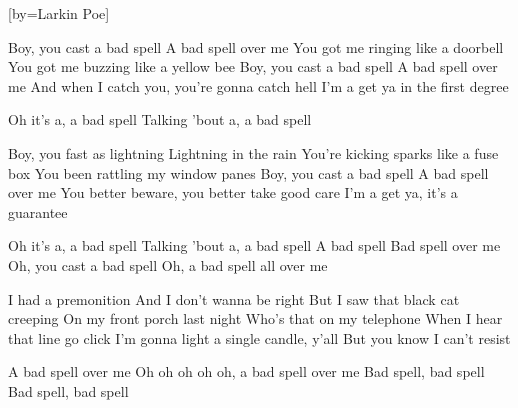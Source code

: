 [by={Larkin Poe}]


  \chordsoff
  
  \beginverse
  Boy, you cast a bad spell
  A bad spell over me
  You got me ringing like a doorbell
  You got me buzzing like a yellow bee
  Boy, you cast a bad spell
  A bad spell over me
  And when I catch you, you're gonna catch hell
  I'm a get ya in the first degree
  \endverse
  
  \beginchorus  
  Oh it's a, a bad spell
  Talking 'bout a, a bad spell
  \endchorus

  \beginverse
  Boy, you fast as lightning
  Lightning in the rain
  You're kicking sparks like a fuse box
  You been rattling my window panes
  Boy, you cast a bad spell
  A bad spell over me
  You better beware, you better take good care
  I'm a get ya, it's a guarantee
  \endverse

  \chordson
  
  \beginchorus  
  
  Oh it's a, a bad spell
  Talking 'bout a, a bad spell
  A bad spell
  Bad spell over me
  Oh, you cast a bad spell
  Oh, a bad spell all over me
  \endchorus

  
  \beginverse
  I had a premonition
  And I don't wanna be right
  But I saw that black cat creeping
  On my front porch last night
  Who's that on my telephone
  When I hear that line go click
  I'm gonna light a single candle, y'all
  But you know I can't resist
  \endverse

  \chordsoff
  
  \beginchorus
  A bad spell over me
  Oh oh oh oh oh, a bad spell over me
  Bad spell, bad spell
  Bad spell, bad spell
  \endchorus
\endsong  
  
